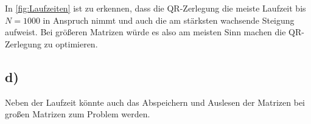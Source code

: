     In \autoref{fig:Laufzeiten} ist zu erkennen, dass die QR-Zerlegung die meiste Laufzeit bis $N=1000$ in Anspruch nimmt und auch die am stärksten wachsende Steigung aufweist.
    Bei größeren Matrizen würde es also am meisten Sinn machen die QR-Zerlegung zu optimieren.

\subsection{d)}
    Neben der Laufzeit könnte auch das Abspeichern und Auslesen der Matrizen bei großen Matrizen zum Problem werden.